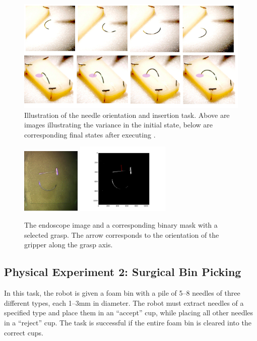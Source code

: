 \begin{figure}[ht!]
    \centering
    \includegraphics[width=\textwidth]{ddco-experiments/exp3-1.png}
    \caption{Illustration of the needle orientation and insertion task. Above are images illustrating the variance in the initial state, below are corresponding final states after executing \alg.  \label{fig:dvrkexp3-1}}
\end{figure}


\begin{figure}[ht!]
    \centering
    \includegraphics[width=0.25\textwidth]{ddco-experiments/image.png}
    \includegraphics[width=0.4\textwidth]{ddco-experiments/binary-mask.png}
    \caption{The endoscope image and a corresponding binary mask with a selected grasp. The arrow corresponds to the orientation of the gripper along the grasp axis.  \label{fig:dvrkim}}
\end{figure}


\subsection*{Physical Experiment 2: Surgical Bin Picking}
In this task, the robot is given a foam bin with a pile of 5--8 needles of three different types, each 1--3mm in diameter.
The robot must extract needles of a specified type and place them in an ``accept'' cup, while placing all other needles in a ``reject'' cup.
The task is successful if the entire foam bin is cleared into the correct cups.

